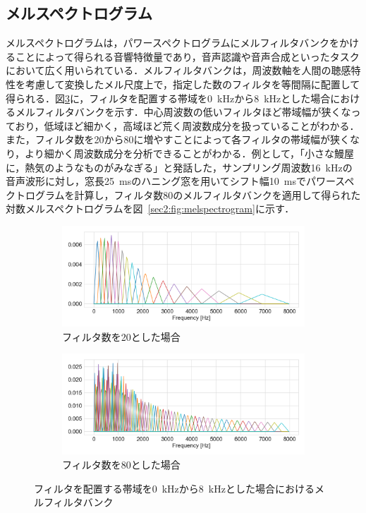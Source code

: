 \subsection{メルスペクトログラム}
メルスペクトログラムは，パワースペクトログラムにメルフィルタバンクをかけることによって得られる音響特徴量であり，音声認識や音声合成といったタスクにおいて広く用いられている．メルフィルタバンクは，周波数軸を人間の聴感特性を考慮して変換したメル尺度上で，指定した数のフィルタを等間隔に配置して得られる．図\ref{sec2:fig:melfb}に，フィルタを配置する帯域を\SI{0}{\kHz}から\SI{8}{\kHz}とした場合におけるメルフィルタバンクを示す．中心周波数の低いフィルタほど帯域幅が狭くなっており，低域ほど細かく，高域ほど荒く周波数成分を扱っていることがわかる．また，フィルタ数を20から80に増やすことによって各フィルタの帯域幅が狭くなり，より細かく周波数成分を分析できることがわかる．例として，「小さな鰻屋に，熱気のようなものがみなぎる」と発話した，サンプリング周波数\SI{16}{\kHz}の音声波形に対し，窓長\SI{25}{\ms}のハニング窓を用いてシフト幅\SI{10}{\ms}でパワースペクトログラムを計算し，フィルタ数80のメルフィルタバンクを適用して得られた対数メルスペクトログラムを図~\ref{sec2:fig:melspectrogram}に示す．

\begin{figure}[tb]
    \centering
    \begin{subfigure}[b]{1.0\textwidth}
        \centering
        \includegraphics[width=150mm]{./figure/sec2/melfb/onedim_20.png}
        \caption{フィルタ数を20とした場合}
        \label{sec2:fig:melfb_20}
    \end{subfigure}

    \vspace{0.5cm}

    \begin{subfigure}[b]{1.0\textwidth}
        \centering
        \includegraphics[width=150mm]{./figure/sec2/melfb/onedim_80.png}
        \caption{フィルタ数を80とした場合}
        \label{sec2:fig:melfb_80}
    \end{subfigure}
    \caption{フィルタを配置する帯域を\SI{0}{\kHz}から\SI{8}{\kHz}とした場合におけるメルフィルタバンク}
    \label{sec2:fig:melfb}
\end{figure}

